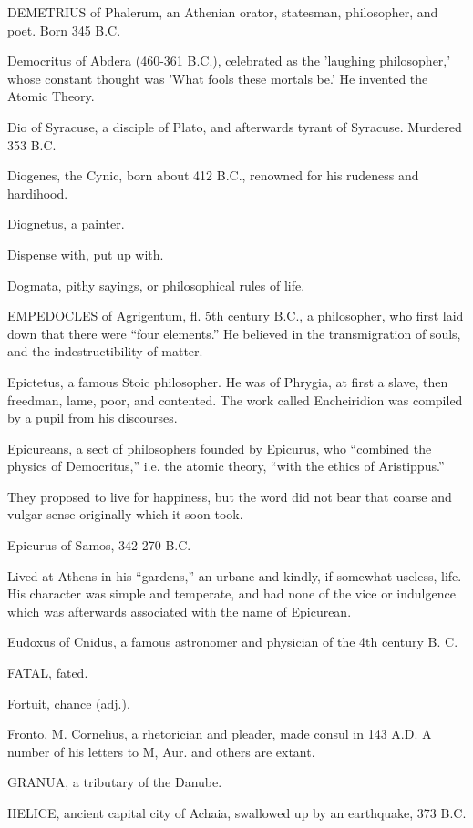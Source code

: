 DEMETRIUS of Phalerum, an Athenian orator, statesman, philosopher, and
poet. Born 345 B.C.

Democritus of Abdera (460-361 B.C.), celebrated as the 'laughing
philosopher,' whose constant thought was 'What fools these mortals be.' He
invented the Atomic Theory.

Dio of Syracuse, a disciple of Plato, and afterwards tyrant of Syracuse.
Murdered 353 B.C.

Diogenes, the Cynic, born about 412 B.C., renowned for his rudeness and
hardihood.

Diognetus, a painter.

Dispense with, put up with.

Dogmata, pithy sayings, or philosophical rules of life.

EMPEDOCLES of Agrigentum, fl. 5th century B.C., a philosopher, who first
laid down that there were ``four elements.'' He believed in the
transmigration of souls, and the indestructibility of matter.

Epictetus, a famous Stoic philosopher. He was of Phrygia, at first a
slave, then freedman, lame, poor, and contented. The work called
Encheiridion was compiled by a pupil from his discourses.

Epicureans, a sect of philosophers founded by Epicurus, who ``combined the
physics of Democritus,'' i.e. the atomic theory, ``with the ethics of
Aristippus.''

They proposed to live for happiness, but the word did not bear that coarse
and vulgar sense originally which it soon took.

Epicurus of Samos, 342-270 B.C.

Lived at Athens in his ``gardens,'' an urbane and kindly, if somewhat
useless, life. His character was simple and temperate, and had none of the
vice or indulgence which was afterwards associated with the name of
Epicurean.

Eudoxus of Cnidus, a famous astronomer and physician of the 4th century B.
C.

FATAL, fated.

Fortuit, chance (adj.).

Fronto, M. Cornelius, a rhetorician and pleader, made consul in 143 A.D. A
number of his letters to M, Aur. and others are extant.

GRANUA, a tributary of the Danube.

HELICE, ancient capital city of Achaia, swallowed up by an earthquake, 373
B.C.

